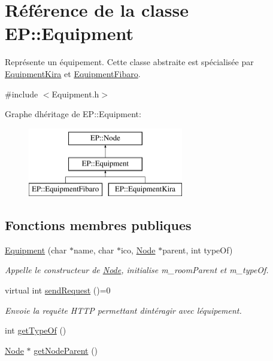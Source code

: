 \hypertarget{class_e_p_1_1_equipment}{}\section{Référence de la classe EP\+:\+:Equipment}
\label{class_e_p_1_1_equipment}


Représente un équipement. Cette classe abstraite est spécialisée par \hyperlink{class_e_p_1_1_equipment_kira}{Equipment\+Kira} et \hyperlink{class_e_p_1_1_equipment_fibaro}{Equipment\+Fibaro}.  




{\ttfamily \#include $<$Equipment.\+h$>$}

Graphe d\textquotesingle{}héritage de EP\+:\+:Equipment\+:\begin{figure}[H]
\begin{center}
\leavevmode
\includegraphics[height=3.000000cm]{class_e_p_1_1_equipment}
\end{center}
\end{figure}
\subsection*{Fonctions membres publiques}
\begin{DoxyCompactItemize}
\item 
\hyperlink{class_e_p_1_1_equipment_a7fce8df2fed82ae05a50f1489307e2ae}{Equipment} (char $\ast$name, char $\ast$ico, \hyperlink{class_e_p_1_1_node}{Node} $\ast$parent, int type\+Of)
\begin{DoxyCompactList}\small\item\em Appelle le constructeur de \hyperlink{class_e_p_1_1_node}{Node}, initialise m\+\_\+room\+Parent et m\+\_\+type\+Of. \end{DoxyCompactList}\item 
virtual int \hyperlink{class_e_p_1_1_equipment_ab95a169fa00d4b7408bf30320f5b7ad8}{send\+Request} ()=0\hypertarget{class_e_p_1_1_equipment_ab95a169fa00d4b7408bf30320f5b7ad8}{}\label{class_e_p_1_1_equipment_ab95a169fa00d4b7408bf30320f5b7ad8}

\begin{DoxyCompactList}\small\item\em Envoie la requête H\+T\+TP permettant d\textquotesingle{}intéragir avec l\textquotesingle{}équipement. \end{DoxyCompactList}\item 
int \hyperlink{class_e_p_1_1_equipment_aac7c97005aec719e51483c9719386015}{get\+Type\+Of} ()
\item 
\hyperlink{class_e_p_1_1_node}{Node} $\ast$ \hyperlink{class_e_p_1_1_equipment_a4a65e982a7ca98587344786d57745b22}{get\+Node\+Parent} ()
\end{DoxyCompactItemize}
